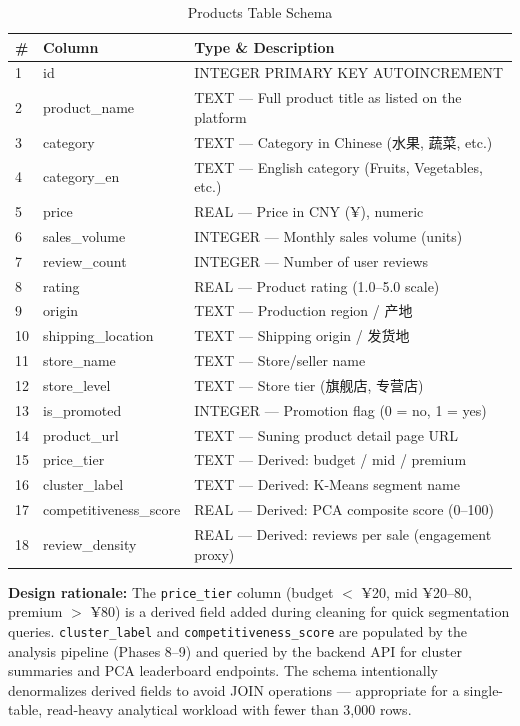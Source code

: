\documentclass[12pt,a4paper]{report}
\begin{document}
\begin{table}[H]
  \centering
  \caption{Products Table Schema}
  \begin{tabular}{@{}llp{7cm}@{}}
    \toprule
    \textbf{\#} & \textbf{Column} & \textbf{Type \& Description} \\
    \midrule
    1  & id                    & INTEGER PRIMARY KEY AUTOINCREMENT \\
    2  & product\_name         & TEXT --- Full product title as listed on the platform \\
    3  & category              & TEXT --- Category in Chinese (水果, 蔬菜, etc.) \\
    4  & category\_en          & TEXT --- English category (Fruits, Vegetables, etc.) \\
    5  & price                 & REAL --- Price in CNY (¥), numeric \\
    6  & sales\_volume         & INTEGER --- Monthly sales volume (units) \\
    7  & review\_count         & INTEGER --- Number of user reviews \\
    8  & rating                & REAL --- Product rating (1.0--5.0 scale) \\
    9  & origin                & TEXT --- Production region / 产地 \\
    10 & shipping\_location    & TEXT --- Shipping origin / 发货地 \\
    11 & store\_name           & TEXT --- Store/seller name \\
    12 & store\_level          & TEXT --- Store tier (旗舰店, 专营店) \\
    13 & is\_promoted          & INTEGER --- Promotion flag (0 = no, 1 = yes) \\
    14 & product\_url          & TEXT --- Suning product detail page URL \\
    15 & price\_tier           & TEXT --- Derived: budget / mid / premium \\
    16 & cluster\_label        & TEXT --- Derived: K-Means segment name \\
    17 & competitiveness\_score& REAL --- Derived: PCA composite score (0--100) \\
    18 & review\_density       & REAL --- Derived: reviews per sale (engagement proxy) \\
    \bottomrule
  \end{tabular}
\end{table}

\textbf{Design rationale:} The \texttt{price\_tier} column (budget $<$ ¥20, mid ¥20--80, premium $>$ ¥80) is a derived field added during cleaning for quick segmentation queries. \texttt{cluster\_label} and \texttt{competitiveness\_score} are populated by the analysis pipeline (Phases 8--9) and queried by the backend API for cluster summaries and PCA leaderboard endpoints. The schema intentionally denormalizes derived fields to avoid JOIN operations --- appropriate for a single-table, read-heavy analytical workload with fewer than 3,000 rows.
\end{document}

